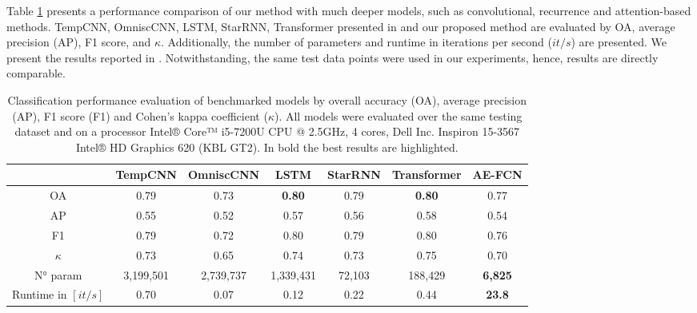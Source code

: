 \documentclass[journal,article,submit,pdftex,moreauthors]{Definitions/mdpi}
\begin{document}
Table \ref{Quantitative_results} presents a performance comparison of our method with much deeper models, such as convolutional, recurrence and attention-based methods. 
TempCNN, OmniscCNN, LSTM, StarRNN, Transformer presented in \cite{Russwurm2020} and our proposed method are evaluated by OA, average precision (AP), F1 score, and $\kappa$. 
Additionally, the number of parameters and runtime in iterations per second ($it/s$) are presented. 
We present the results reported in \cite{Russwurm2020}. 
Notwithstanding, the same test data points were used in our experiments, hence, results are directly comparable.

\begin{table}[H]
	\centering
	\caption{Classification performance evaluation of benchmarked models by overall accuracy (OA), average precision (AP), F1 score (F1) and Cohen’s kappa coefficient ($\kappa$). All models were evaluated over the same testing dataset and on a processor Intel® Core™ i5-7200U CPU @ 2.5GHz, 4 cores, Dell Inc. Inspiron 15-3567 Intel® HD Graphics 620 (KBL GT2). In bold the best results are highlighted.}
	\footnotesize
	\begin{tabular}{c| c c c c c c}
	\hline
	    & TempCNN & OmniscCNN & LSTM            & StarRNN & Transformer     & \textbf{AE-FCN}\\[1.1ex]
	\hline   
	OA  & 0.79    & 0.73      & \textbf{0.80}   & 0.79     & \textbf{0.80}  & 0.77 \\
	AP  & 0.55    & 0.52      & 0.57            & 0.56     & 0.58           &  0.54\\
	F1  & 0.79    & 0.72      & 0.80            & 0.79     & 0.80           &  0.76\\
$\kappa$& 0.73    & 0.65      & 0.74            & 0.73     & 0.75           &  0.70\\ [1.2ex]
	\hline
N° param & 3,199,501 & 2,739,737 & 1,339,431     & 72,103   & 188,429       & \textbf{6,825} \\
\makecell{Runtime in\\$[it/s]$}  & 0.70 & 0.07 & 0.12  & 0.22 & 0.44        & \textbf{23.8} \\
	\hline
\end{tabular}
\label{Quantitative_results}
\end{table}
\end{document}
